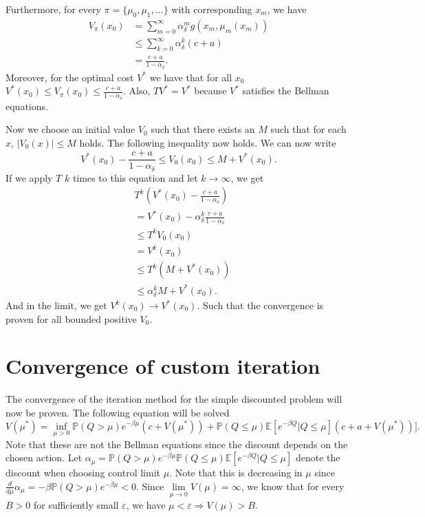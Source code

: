 Furthermore, for every $\pi=\{\mu_0,\mu_1,...\}$ with corresponding $x_m$, we have
\begin{equation}
\begin{split}
V_\pi(x_0)&=\sum\limits_{m=0}^{\infty}\alpha_\delta^mg(x_m,\mu_m(x_m))\\
&\leq \sum\limits_{k=0}^\infty\alpha_\delta^k(c+a)\\
&=\frac{c+a}{1-\alpha_\delta}.
\end{split}
\end{equation}
Moreover, for the optimal cost $V^*$ we have that for all $x_0$ $V^*(x_0)\leq V_\pi(x_0)\leq \frac{c+a}{1-\alpha_\delta}$. Also, $TV^*=V^*$ because $V^*$ satisfies the Bellman equations.

Now we choose an initial value $V_0$ such that there exists an $M$ such that for each $x$, $|V_0(x)|\leq M$ holds.
The following inequality now holds.
We can now write
\begin{equation}V^*(x_0)-\frac{c+a}{1-\alpha_\delta}\leq V_0(x_0)\leq M + V^*(x_0).
\end{equation}
If we apply $T$ $k$ times to this equation and let $k\rightarrow\infty$, we get
\begin{equation}
\begin{split}
&T^k(V^*(x_0)-\frac{c+a}{1-\alpha_\delta})\\
&=V^*(x_0)-\alpha_\delta^k\frac{c+a}{1-\alpha_\delta}\\
&\leq T^k V_0(x_0)\\
&=V^k(x_0)\\
&\leq T^k(M + V^*(x_0))\\
&\leq \alpha_\delta^kM+V^*(x_0).
\end{split}
\end{equation}
And in the limit, we get $V^k(x_0)\rightarrow V^*(x_0)$. Such that the convergence is proven for all bounded positive $V_0$.
\section{Convergence of custom iteration}
The convergence of the iteration method for the simple discounted problem will now be proven.
The following equation will be solved
\begin{equation}\label{eq:notBellman}
V(\mu^*)=\inf\limits_{\mu>0}\mathbb{P}(Q>\mu)e^{-\beta \mu}(c+V(\mu^*))+\mathbb{P}(Q\leq \mu)\mathbb{E}[e^{-\beta Q}|Q\leq \mu](c+a+V(\mu^*))]. 
\end{equation}
Note that these are not the Bellman equations since the discount depends on the chosen action.
Let $\alpha_\mu=\mathbb{P}(Q>\mu)e^{-\beta \mu} \mathbb{P}(Q\leq \mu)\mathbb{E}[e^{-\beta Q}|Q\leq \mu]$ denote the discount when choosing control limit $\mu$.
Note that this is decreasing in $\mu$ since $\frac{d}{d\mu}\alpha_\mu=-\beta\mathbb{P}(Q>\mu)e^{-\beta \mu}<0$.
Since $\lim\limits_{\mu\rightarrow 0}V(\mu)=\infty$, we know that for every $B>0$ for sufficiently small $\varepsilon$, we have $\mu<\varepsilon\Rightarrow V(\mu)>B$.


